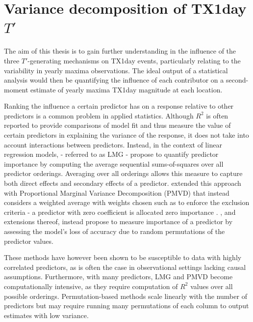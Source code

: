\documentclass[11pt,a4paper,twoside,openright]{report}
\theoremstyle{definition}
\begin{document}
\section{\texorpdfstring{Variance decomposition of TX1day \(T'\)}{Variance decomposition of TX1day T\textquotesingle{}}}\label{variance-decomposition-of-tx1day-t}

The aim of this thesis is to gain further understanding in the influence of the three \(T'\)-generating mechanisms on TX1day events, particularly relating to the variability in yearly maxima observations. The ideal output of a statistical analysis would then be quantifying the influence of each contributor on a second-moment estimate of yearly maxima TX1day magnitude at each location.

Ranking the influence a certain predictor has on a response relative to other predictors is a common problem in applied statistics. Although \(R^2\) is often reported to provide comparisons of model fit and thus measure the value of certain predictors in explaining the variance of the response, it does not take into account interactions between predictors. Instead, in the context of linear regression models, \cite{lindeman_introduction_1980} - referred to as LMG - propose to quantify predictor importance by computing the average sequential sums-of-squares over all predictor orderings. Averaging over all orderings allows this measure to capture both direct effects and secondary effects of a predictor. \cite{feldman_relative_2005} extended this approach with Proportional Marginal Variance Decomposition (PMVD) that instead considers a weighted average with weights chosen such as to enforce the exclusion criteria - a predictor with zero coefficient is allocated zero importance \citep{gromping_estimators_2007}. \cite{breiman_random_2001}, and extensions thereof, instead propose to measure importance of a predictor by assessing the model's loss of accuracy due to random permutations of the predictor values.

These methods have however been shown to be susceptible to data with highly correlated predictors, as is often the case in observational settings lacking causal assumptions. Furthermore, with many predictors, LMG and PMVD become computationally intensive, as they require computation of \(R^2\) values over all possible orderings. Permutation-based methods scale linearly with the number of predictors but may require running many permutations of each column to output estimates with low variance.
\end{document}
